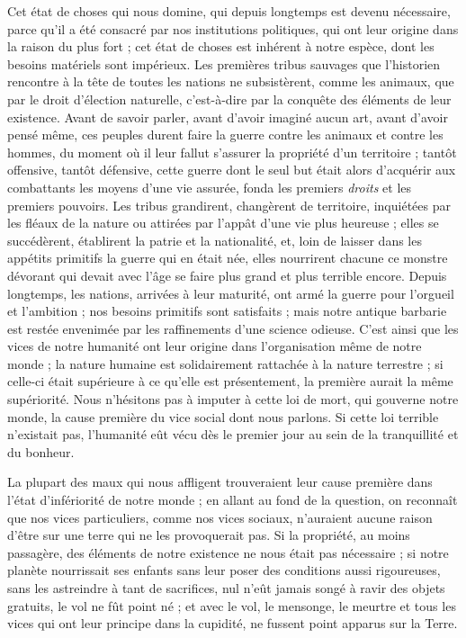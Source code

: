 \documentclass[a4paper, 11pt, oneside, landscape]{article}
\begin{document}
Cet état de choses qui nous domine, qui depuis longtemps est devenu nécessaire, parce qu'il a été consacré par nos institutions politiques, qui ont leur origine dans la raison du plus fort ; cet état de choses est inhérent à notre espèce, dont les besoins matériels sont impérieux. Les premières tribus sauvages que l'historien rencontre à la tête de toutes les nations ne subsistèrent, comme les animaux, que par le droit d'élection naturelle, c'est-à-dire par la conquête des éléments de leur existence. Avant de savoir parler, avant d'avoir imaginé aucun art, avant d'avoir pensé même, ces peuples durent faire la guerre contre les animaux et contre les hommes, du moment où il leur fallut s'assurer la propriété d'un territoire ; tantôt offensive, tantôt défensive, cette guerre dont le seul but était alors d'acquérir aux combattants les moyens d'une vie assurée, fonda les premiers \emph{droits} et les premiers pouvoirs. Les tribus grandirent, changèrent de territoire, inquiétées par les fléaux de la nature ou attirées par l'appât d'une vie plus heureuse ; elles se succédèrent, établirent la patrie et la nationalité, et, loin de laisser dans les appétits primitifs la guerre qui en était née, elles nourrirent chacune ce monstre dévorant qui devait avec l'âge se faire plus grand et plus terrible encore. Depuis longtemps, les nations, arrivées à leur maturité, ont armé la guerre pour l'orgueil et l'ambition ; nos besoins primitifs sont satisfaits ; mais notre antique barbarie est restée envenimée par les raffinements d'une science odieuse. C'est ainsi que les vices de notre humanité ont leur origine dans l'organisation même de notre monde ; la nature humaine est solidairement rattachée à la nature terrestre ; si celle-ci était supérieure à ce qu'elle est présentement, la première aurait la même supériorité. Nous n'hésitons pas à imputer à cette loi de mort, qui gouverne notre monde, la cause première du vice social dont nous parlons. Si cette loi terrible n'existait pas, l'humanité eût vécu dès le premier jour au sein de la tranquillité et du bonheur.

La plupart des maux qui nous affligent trouveraient leur cause première dans l'état d'infériorité de notre monde ; en allant au fond de la question, on reconnaît que nos vices particuliers, comme nos vices sociaux, n'auraient aucune raison d'être sur une terre qui ne les provoquerait pas. Si la propriété, au moins passagère, des éléments de notre existence ne nous était pas nécessaire ; si notre planète nourrissait ses enfants sans leur poser des conditions aussi rigoureuses, sans les astreindre à tant de sacrifices, nul n'eût jamais songé à ravir des objets gratuits, le vol ne fût point né ; et avec le vol, le mensonge, le meurtre et tous les vices qui ont leur principe dans la cupidité, ne fussent point apparus sur la Terre.
\end{document}
